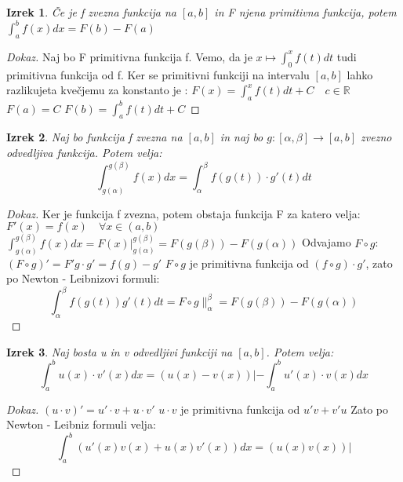 \documentclass[11pt]{article}
\newtheorem{Izrek}{{\sc Izrek}}[section]
\newenvironment{dokaz}[1][{\sc Dokaz}]{\begin{proof}[#1]\renewcommand*{\qedsymbol}{\(\blacksquare\)}}{\end{proof}}
\begin{document}
\begin{Izrek}
	Če je f zvezna funkcija na $[a,b]$ in F njena primitivna funkcija, potem $\int_{a}^{b}{f(x)dx} = F(b) - F(a)$
\end{Izrek}
\begin{dokaz}
	Naj bo F primitivna funkcija f. Vemo, da je $x\mapsto \int_{0}^{x}{f(t) dt}$ tudi primitivna funkcija od f. Ker se primitivni funkciji na intervalu $[a,b]$ lahko razlikujeta kvečjemu za konstanto je :
	\newline
	$F(x) = \int_{a}^{x}{f(t)dt} + C \quad c\in\mathbb{R}$
	\newline
	$F(a) = C$
	\newline
	$F(b) = \int_{a}^{b}{f(t) dt} + C$
	
\end{dokaz}
\begin{Izrek}
	Naj bo funkcija f zvezna na $[a,b]$ in naj bo $g: [\alpha, \beta]\to [a,b]$ zvezno odvedljiva funkcija. Potem velja:
	$$\int_{g(\alpha)}^{g(\beta)}{f(x) dx} = \int_{\alpha}^{\beta}{f(g(t)) \cdot g'(t) dt}$$
\end{Izrek}
\begin{dokaz}
	Ker je funkcija f zvezna, potem obstaja funkcija F za katero velja:
	\\
	$F'(x) =f(x) \quad \forall x\in(a,b)$
	\\
	$\int_{g(\alpha)}^{g(\beta)}{f(x) dx} = F(x) |^{g(\beta)}_{g(\alpha)} = F(g(\beta)) - F(g(\alpha))$
	\newline
	Odvajamo $F\circ g$: $(F\circ g)' = F'g \cdot g' = f(g) - g'$
	\newline
	$F\circ g$ je primitivna funkcija od $(f\circ g)\cdot g' $, zato po Newton - Leibnizovi formuli:
	$$\int_{\alpha}^{\beta}{f(g(t)) g'(t) dt} = F\circ g \|^\beta _\alpha = F(g(\beta)) - F(g(\alpha))$$
\end{dokaz}
\begin{Izrek}
	Naj bosta u in v odvedljivi funkciji na $[a,b]$. Potem velja:
	$$\int_{a}^{b}{u(x)\cdot v'(x) dx} = (u(x) -v(x))| - \int_{a}^{b}{u'(x) \cdot v(x) dx}$$
\end{Izrek}
\begin{dokaz}
	$(u\cdot v)' = u' \cdot v + u \cdot v'$
	\newline
	$u\cdot v$ je primitivna funkcija od $u'v + v'u$
	\newline
	Zato po Newton - Leibniz formuli velja:
	$$\int_{a}^{b}{(u'(x)v(x) + u(x)v'(x) ) dx }= (u(x) v(x))|$$
\end{dokaz}
\end{document}

